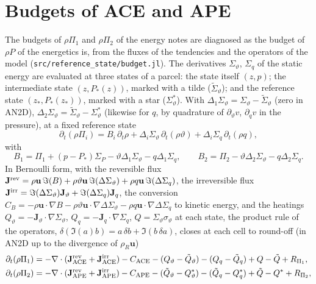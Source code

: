 \documentclass[11pt,a4paper]{article}
\newcommand{\vt}{\vartheta}
\newcommand{\code}[1]{\texttt{#1}}
\newcommand{\zs}{z_{*}}
\begin{document}
\section{Budgets of ACE and APE}\label{sec:budgets}
The budgets of $\rho\Pi_1$ and $\rho\Pi_2$ of the energy notes are diagnosed as the budget of $\rho P$ of the energetics is,
from the fluxes of the tendencies and the operators of the model (\code{src/reference\_state/budget.jl}). The derivatives
$\Sigma_\vt$, $\Sigma_q$ of the static energy are evaluated at three states of a parcel: the state itself $(z,p)$; the
intermediate state $(z,P_*(z))$, marked with a tilde ($\tilde\Sigma_\vt$); and the reference state $(\zs,P_*(\zs))$, marked
with a star ($\Sigma^*_\vt$). With
$\Delta_1\Sigma_\vt=\Sigma_\vt-\tilde\Sigma_\vt$ (zero in AN2D), $\Delta_2\Sigma_\vt=\tilde\Sigma_\vt-\Sigma^*_\vt$ (likewise for
$q$, by quadrature of $\partial_\vt v$, $\partial_qv$ in the pressure), at a fixed reference state
\begin{equation}
  \partial_t(\rho\Pi_i)=B_i\,\partial_t\rho+\Delta_i\Sigma_\vt\,\partial_t(\rho\vt)+\Delta_i\Sigma_q\,\partial_t(\rho q),
\end{equation}
with
\begin{equation}
  B_1=\Pi_1+(p-P_*)\Sigma_P-\vt\Delta_1\Sigma_\vt-q\Delta_1\Sigma_q,\qquad B_2=\Pi_2-\vt\Delta_2\Sigma_\vt-q\Delta_2\Sigma_q .
\end{equation}
In Bernoulli form, with the reversible flux $\mathbf J^{\rm rev}=\rho\mathbf u\,\Im(B)+\rho\vt\mathbf u\,\Im(\Delta\Sigma_\vt)+
\rho q\mathbf u\,\Im(\Delta\Sigma_q)$, the irreversible flux $\mathbf J^{\rm irr}=\Im(\Delta\Sigma_\vt)\mathbf J_\vt+
\Im(\Delta\Sigma_q)\mathbf J_q$, the conversion $C_B=-\rho\mathbf u\cdot\nabla B-\rho\vt\mathbf u\cdot\nabla\Delta\Sigma_\vt
-\rho q\mathbf u\cdot\nabla\Delta\Sigma_q$ to kinetic energy, and the heatings $Q_\vt=-\mathbf J_\vt\cdot\nabla\Sigma_\vt$,
$Q_q=-\mathbf J_q\cdot\nabla\Sigma_q$, $Q=\Sigma_\vt\sigma_\vt$ at each state, the product rule of the operators,
$\delta(\Im(a)b)=a\,\delta b+\Im(b\,\delta a)$, closes at each cell to round-off (in AN2D up to the divergence of $\rho_R\mathbf u$)
\begin{align}
  \partial_t(\rho\Pi_1)&=-\nabla\cdot(\mathbf J^{\rm rev}_{\rm ACE}+\mathbf J^{\rm irr}_{\rm ACE})-C_{\rm ACE}
     -(Q_\vt-\tilde Q_\vt)-(Q_q-\tilde Q_q)+Q-\tilde Q+R_{\Pi_1},\\
  \partial_t(\rho\Pi_2)&=-\nabla\cdot(\mathbf J^{\rm rev}_{\rm APE}+\mathbf J^{\rm irr}_{\rm APE})-C_{\rm APE}
     -(\tilde Q_\vt-Q^*_\vt)-(\tilde Q_q-Q^*_q)+\tilde Q-Q^*+R_{\Pi_2},
\end{align}
\end{document}
